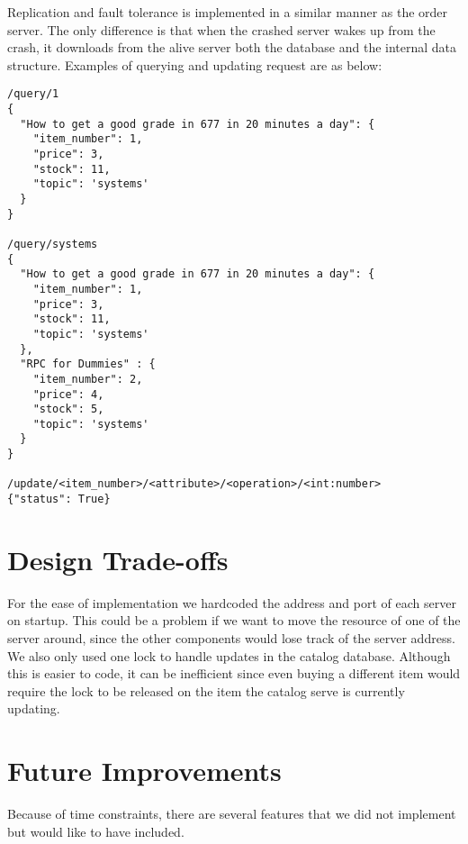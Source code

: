\documentclass[11pt,]{article}
\begin{document}
Replication and fault tolerance is implemented in a similar manner as
the order server. The only difference is that when the crashed server
wakes up from the crash, it downloads from the alive server both the
database and the internal data structure. Examples of querying and
updating request are as below:

\begin{verbatim}
/query/1
{
  "How to get a good grade in 677 in 20 minutes a day": {
    "item_number": 1,
    "price": 3,
    "stock": 11,
    "topic": 'systems'
  }
}

/query/systems
{
  "How to get a good grade in 677 in 20 minutes a day": {
    "item_number": 1,
    "price": 3,
    "stock": 11,
    "topic": 'systems'
  },
  "RPC for Dummies" : {
    "item_number": 2,
    "price": 4,
    "stock": 5,
    "topic": 'systems'
  }
}

/update/<item_number>/<attribute>/<operation>/<int:number>
{"status": True}
\end{verbatim}

\hypertarget{design-trade-offs}{%
\section{Design Trade-offs}\label{design-trade-offs}}

For the ease of implementation we hardcoded the address and port of each
server on startup. This could be a problem if we want to move the
resource of one of the server around, since the other components would
lose track of the server address. We also only used one lock to handle
updates in the catalog database. Although this is easier to code, it can
be inefficient since even buying a different item would require the lock
to be released on the item the catalog serve is currently updating.

\hypertarget{future-improvements}{%
\section{Future Improvements}\label{future-improvements}}

Because of time constraints, there are several features that we did not
implement but would like to have included.
\end{document}

